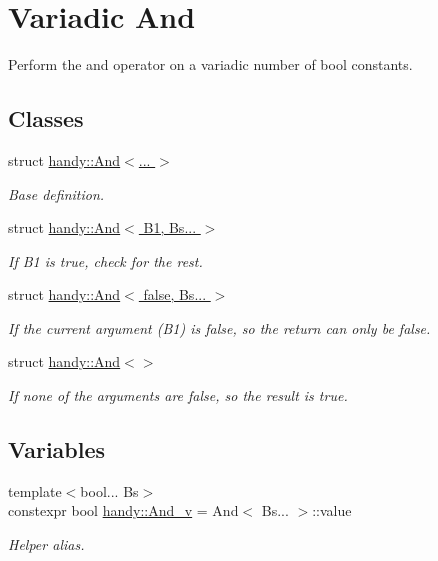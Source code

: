 \hypertarget{group__AndGroup}{}\section{Variadic And}
\label{group__AndGroup}


Perform the {\ttfamily and} operator on a variadic number of bool constants.  


\subsection*{Classes}
\begin{DoxyCompactItemize}
\item 
struct \hyperlink{structhandy_1_1And}{handy\+::\+And$<$... $>$}
\begin{DoxyCompactList}\small\item\em Base definition. \end{DoxyCompactList}\item 
struct \hyperlink{structhandy_1_1And_3_01B1_00_01Bs_8_8_8_01_4}{handy\+::\+And$<$ B1, Bs... $>$}
\begin{DoxyCompactList}\small\item\em If {\ttfamily B1} is true, check for the rest. \end{DoxyCompactList}\item 
struct \hyperlink{structhandy_1_1And_3_01false_00_01Bs_8_8_8_01_4}{handy\+::\+And$<$ false, Bs... $>$}
\begin{DoxyCompactList}\small\item\em If the current argument ({\ttfamily B1}) is {\ttfamily false}, so the return can only be {\ttfamily false}. \end{DoxyCompactList}\item 
struct \hyperlink{structhandy_1_1And_3_4}{handy\+::\+And$<$$>$}
\begin{DoxyCompactList}\small\item\em If none of the arguments are {\ttfamily false}, so the result is {\ttfamily true}. \end{DoxyCompactList}\end{DoxyCompactItemize}
\subsection*{Variables}
\begin{DoxyCompactItemize}
\item 
{\footnotesize template$<$bool... Bs$>$ }\\constexpr bool \hyperlink{group__AndGroup_ga0b8333d82725fa020f74b5eee7016dbc}{handy\+::\+And\+\_\+v} = And$<$ Bs... $>$\+::value
\begin{DoxyCompactList}\small\item\em Helper alias. \end{DoxyCompactList}\end{DoxyCompactItemize}


